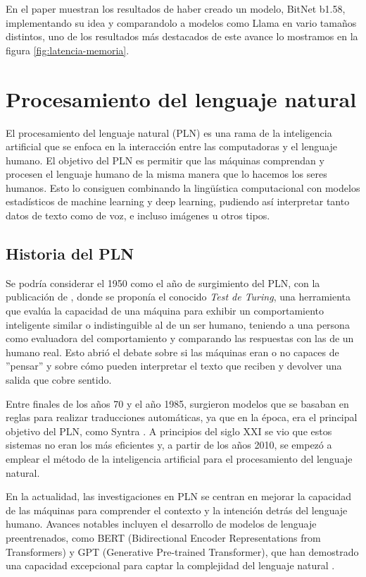 En el paper muestran los resultados de haber creado un modelo, BitNet b1.58, implementando su idea y comparandolo a modelos como Llama en vario tamaños distintos, uno de los resultados más destacados de este avance lo mostramos en la figura \ref{fig:latencia-memoria}.

\section{Procesamiento del lenguaje natural}

El procesamiento del lenguaje natural (PLN) es una rama de la inteligencia artificial que se enfoca en la interacción entre las computadoras y el lenguaje humano. El objetivo del PLN es permitir que las máquinas comprendan y procesen el lenguaje humano de la misma manera que lo hacemos los seres humanos. Esto lo consiguen combinando la lingüística computacional con modelos estadísticos de machine learning y deep learning, pudiendo así interpretar tanto datos de texto como de voz, e incluso imágenes u otros tipos.

\subsection{Historia del PLN}

Se podría considerar el 1950 como el año de surgimiento del PLN, con la publicación de \cite{10.1093/mind/LIX.236.433}, donde se proponía el conocido \textit{Test de Turing}, una herramienta que evalúa la capacidad de una máquina para exhibir un comportamiento inteligente similar o indistinguible al de un ser humano, teniendo a una persona como evaluadora del comportamiento y comparando las respuestas con las de un humano real. Esto abrió el debate sobre si las máquinas eran o no capaces de ''pensar'' y sobre cómo pueden interpretar el texto que reciben y devolver una salida que cobre sentido.

Entre finales de los años 70 y el año 1985, surgieron modelos que se basaban en reglas para realizar traducciones automáticas, ya que en la época, era el principal objetivo del PLN, como Syntra \citep{Toma1970SYSTRANMT}. A principios del siglo XXI se vio que estos sistemas no eran los más eficientes y, a partir de los años 2010, se empezó a emplear el método de la inteligencia artificial para el procesamiento del lenguaje natural.

En la actualidad, las investigaciones en PLN se centran en mejorar la capacidad de las máquinas para comprender el contexto y la intención detrás del lenguaje humano. Avances notables incluyen el desarrollo de modelos de lenguaje preentrenados, como BERT (Bidirectional Encoder Representations from Transformers) y GPT (Generative Pre-trained Transformer), que han demostrado una capacidad excepcional para captar la complejidad del lenguaje natural \citep{devlin2019bert}.

